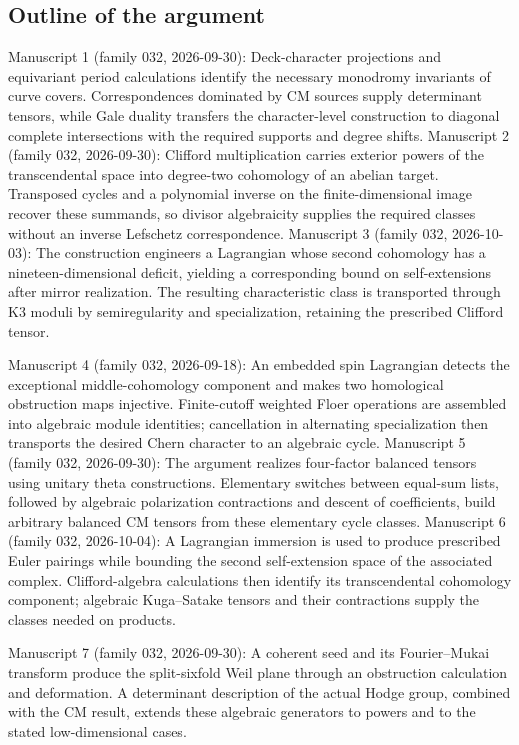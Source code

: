\documentclass[11pt]{article}
\begin{document}
\subsection{Outline of the argument}
Manuscript 1 (family 032, 2026-09-30): Deck-character projections and equivariant period calculations identify the necessary monodromy invariants of curve covers. Correspondences dominated by CM sources supply determinant tensors, while Gale duality transfers the character-level construction to diagonal complete intersections with the required supports and degree shifts. Manuscript 2 (family 032, 2026-09-30): Clifford multiplication carries exterior powers of the transcendental space into degree-two cohomology of an abelian target. Transposed cycles and a polynomial inverse on the finite-dimensional image recover these summands, so divisor algebraicity supplies the required classes without an inverse Lefschetz correspondence. Manuscript 3 (family 032, 2026-10-03): The construction engineers a Lagrangian whose second cohomology has a nineteen-dimensional deficit, yielding a corresponding bound on self-extensions after mirror realization. The resulting characteristic class is transported through K3 moduli by semiregularity and specialization, retaining the prescribed Clifford tensor.

Manuscript 4 (family 032, 2026-09-18): An embedded spin Lagrangian detects the exceptional middle-cohomology component and makes two homological obstruction maps injective. Finite-cutoff weighted Floer operations are assembled into algebraic module identities; cancellation in alternating specialization then transports the desired Chern character to an algebraic cycle. Manuscript 5 (family 032, 2026-09-30): The argument realizes four-factor balanced tensors using unitary theta constructions. Elementary switches between equal-sum lists, followed by algebraic polarization contractions and descent of coefficients, build arbitrary balanced CM tensors from these elementary cycle classes. Manuscript 6 (family 032, 2026-10-04): A Lagrangian immersion is used to produce prescribed Euler pairings while bounding the second self-extension space of the associated complex. Clifford-algebra calculations then identify its transcendental cohomology component; algebraic Kuga--Satake tensors and their contractions supply the classes needed on products.

Manuscript 7 (family 032, 2026-09-30): A coherent seed and its Fourier--Mukai transform produce the split-sixfold Weil plane through an obstruction calculation and deformation. A determinant description of the actual Hodge group, combined with the CM result, extends these algebraic generators to powers and to the stated low-dimensional cases.
\end{document}
